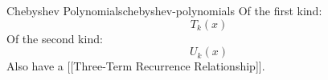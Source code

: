 \begin{definition}{Chebyshev Polynomials}{chebyshev-polynomials}
  Of the first kind: \[T_k(x)\] Of the second kind: \[U_k(x)\] Also have a
  {[}{[}Three-Term Recurrence Relationship{]}{]}.
\end{definition}
